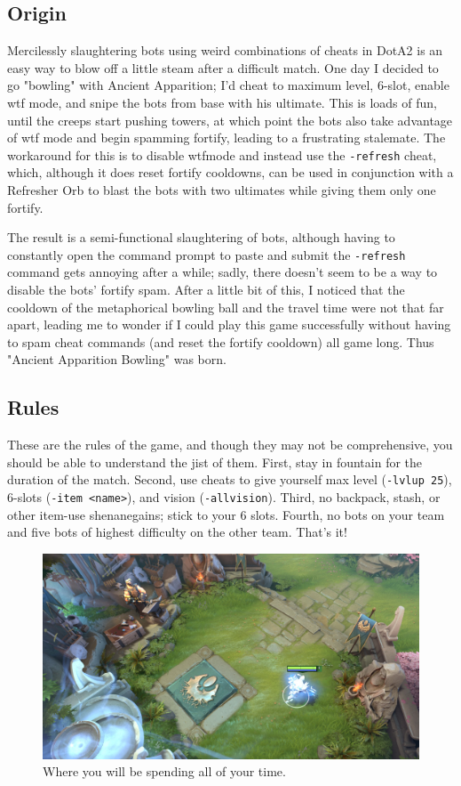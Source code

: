 \documentclass{article}
\begin{document}
\subsection*{Origin}
Mercilessly slaughtering bots using weird combinations of cheats in DotA2 is an easy way to blow off a little steam after a difficult match.  One day I decided to go "bowling" with Ancient Apparition; I'd cheat to maximum level, 6-slot, enable wtf mode, and snipe the bots from base with his ultimate.
This is loads of fun, until the creeps start pushing towers, at which point the bots also take advantage of wtf mode and begin spamming fortify, leading to a frustrating stalemate.  The workaround for this is to disable wtfmode and instead use the \texttt{-refresh} cheat, which, although it does reset fortify cooldowns, can be used in conjunction with a Refresher Orb to blast the bots with two ultimates while giving them only one fortify.

The result is a semi-functional slaughtering of bots, although having to constantly open the command prompt to paste and submit the \texttt{-refresh} command gets annoying after a while; sadly, there doesn't seem to be a way to disable the bots' fortify spam.  After a little bit of this, I noticed that the cooldown of the metaphorical bowling ball and the travel time were not that far apart, leading me to wonder if I could play this game successfully without having to spam cheat commands (and reset the fortify cooldown) all game long.  Thus "Ancient Apparition Bowling" was born.

\subsection*{Rules}
These are the rules of the game, and though they may not be comprehensive, you should be able to understand the jist of them.  First, stay in fountain for the duration of the match.  Second, use cheats to give yourself max level (\texttt{-lvlup 25}), 6-slots (\texttt{-item <name>}), and vision (\texttt{-allvision}).  Third, no backpack, stash, or other item-use shenanegains; stick to your 6 slots.  Fourth, no bots on your team and five bots of highest difficulty on the other team.  That's it!
\begin{figure}
\includegraphics[scale=0.33]{files/blog/2017_07_17_ancient_apparition_bowling/fountain.png}
\caption{Where you will be spending all of your time.}
\end{figure}
\end{document}
